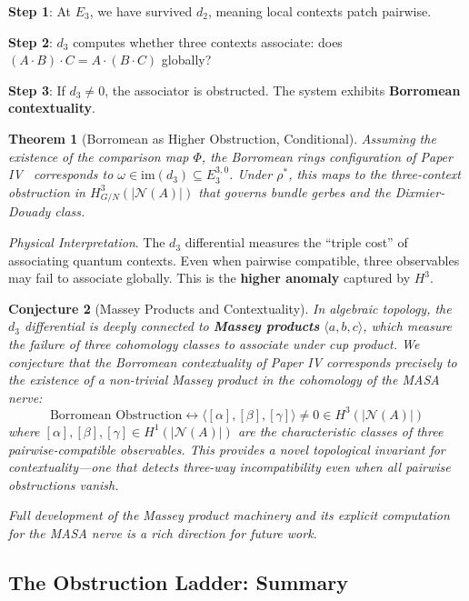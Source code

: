 \documentclass[11pt]{article}
\newtheorem{theorem}{Theorem}[section]
\newtheorem{conjecture}[theorem]{Conjecture}
\begin{document}
\textbf{Step 1}: At $E_3$, we have survived $d_2$, meaning local contexts patch pairwise.

\textbf{Step 2}: $d_3$ computes whether three contexts associate: does $(A \cdot B) \cdot C = A \cdot (B \cdot C)$ globally?

\textbf{Step 3}: If $d_3 \neq 0$, the associator is obstructed. The system exhibits \textbf{Borromean contextuality}.

\begin{theorem}[Borromean as Higher Obstruction, Conditional]\label{thm:borromean}
Assuming the existence of the comparison map $\Phi$, the Borromean rings configuration of Paper IV~\cite{PaperIV} corresponds to $\omega \in \text{im}(d_3) \subseteq E_3^{3,0}$. Under $\rho^*$, this maps to the three-context obstruction in $H^3_{G/N}(|\mathcal{N}(A)|)$ that governs bundle gerbes and the Dixmier-Douady class.
\end{theorem}

\textit{Physical Interpretation}.
The $d_3$ differential measures the ``triple cost'' of associating quantum contexts. Even when pairwise compatible, three observables may fail to associate globally. This is the \textbf{higher anomaly} captured by $H^3$.

\begin{conjecture}[Massey Products and Contextuality]\label{conj:massey}
In algebraic topology, the $d_3$ differential is deeply connected to \textbf{Massey products} $\langle a, b, c \rangle$, which measure the failure of three cohomology classes to associate under cup product. We conjecture that the Borromean contextuality of Paper IV corresponds precisely to the existence of a non-trivial Massey product in the cohomology of the MASA nerve:
\[
\text{Borromean Obstruction} \longleftrightarrow \langle [\alpha], [\beta], [\gamma] \rangle \neq 0 \in H^3(|\mathcal{N}(A)|)
\]
where $[\alpha], [\beta], [\gamma] \in H^1(|\mathcal{N}(A)|)$ are the characteristic classes of three pairwise-compatible observables. This provides a novel topological invariant for contextuality---one that detects three-way incompatibility even when all pairwise obstructions vanish.
\end{conjecture}

\textit{Full development of the Massey product machinery and its explicit computation for the MASA nerve is a rich direction for future work.}


\subsection{The Obstruction Ladder: Summary}
\label{obstruction-ladder}
\end{document}
